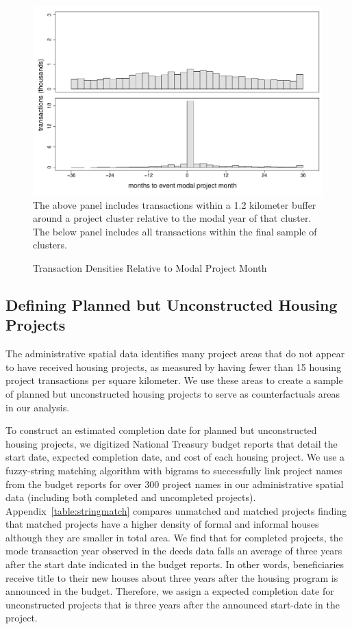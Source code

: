 \documentclass[12pt]{article}
\begin{document}
\begin{figure}
\caption{Transaction Densities Relative to Modal Project Month}\label{figure:densitytime}
\centering
\includegraphics[scale=.5]{figures/summary_densitytime.pdf} \\
The above panel includes transactions within a 1.2 kilometer buffer around a project cluster relative to the modal year of that cluster.  The below panel includes all transactions within the final sample of clusters.
\end{figure}


\subsection{Defining Planned but Unconstructed Housing Projects}

The administrative spatial data identifies many project areas that do not appear to have received housing projects, as measured by having fewer than 15 housing project transactions per square kilometer.  We use these areas to create a sample of planned but unconstructed housing projects to serve as counterfactuals areas in our analysis.

To construct an estimated completion date for planned but unconstructed housing projects, we digitized National Treasury budget reports that detail the start date, expected completion date, and cost of each housing project.  We use a fuzzy-string matching algorithm with bigrams to successfully link project names from the budget reports for over 300 project names in our administrative spatial data (including both completed and uncompleted projects).  Appendix~\ref{table:stringmatch} compares unmatched and matched projects finding that matched projects have a higher density of formal and informal houses although they are smaller in total area.  We find that for completed projects, the mode transaction year observed in the deeds data falls an average of three years after the start date indicated in the budget reports.  In other words, beneficiaries receive title to their new houses about three years after the housing program is announced in the budget.  Therefore, we assign a expected completion date for unconstructed projects that is three years after the announced start-date in the project.  
\end{document}
